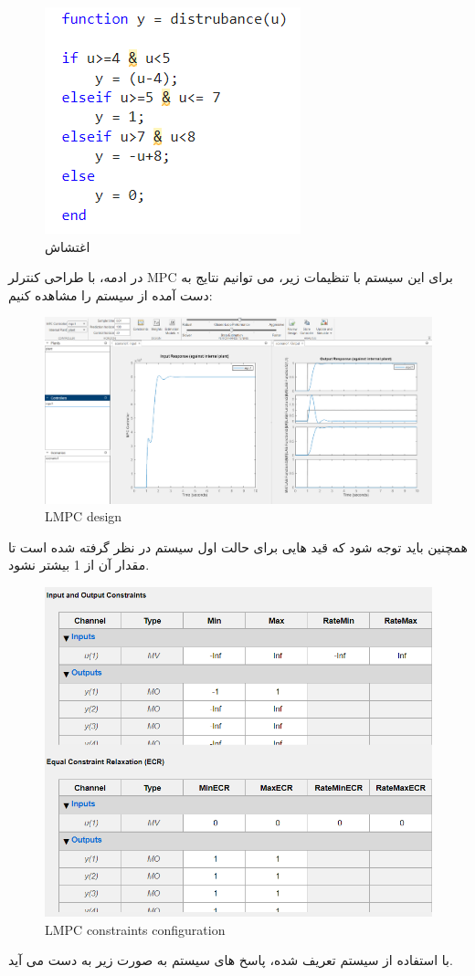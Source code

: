 \begin{figure}[H]
	\centering
	\includegraphics[width=0.4\linewidth]{../img/3}
	\caption{اغتشاش}
	\label{fig:3}
\end{figure}
در ادمه، با طراحی کنترلر MPC برای این سیستم با تنظیمات زیر، می توانیم نتایج به دست آمده از سیستم را مشاهده کنیم:

\begin{figure}[H]
	\centering
	\includegraphics[width=1\linewidth]{../img/4}
	\caption{LMPC design}
	\label{fig:4}
\end{figure}
همچنین باید توجه شود که قید هایی برای حالت اول سیستم در نظر گرفته شده است تا مقدار آن از 1 بیشتر نشود. 

\begin{figure}[H]
	\centering
	\includegraphics[width=1\linewidth]{../img/5}
	\caption{LMPC constraints configuration}
	\label{fig:5}
\end{figure}
با استفاده از سیستم تعریف شده، پاسخ های سیستم به صورت زیر به دست می آید.

